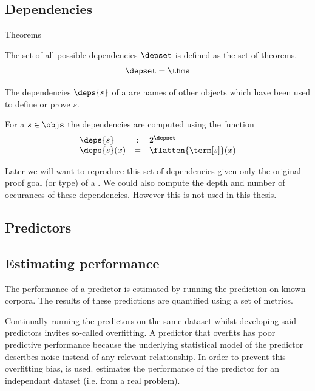 \subsection{Dependencies}
\label{sections:deps}

Theorems 
\begin{definition}\label{def:depset}
  The set of all possible dependencies $\depset$ is defined as the set of theorems.
  $$
  \depset = \thms
  $$
\end{definition}

The dependencies $\deps{s}$ of a \coqobj[s] are names of other objects which have been used to define or prove $s$.

\begin{definition}\label{def:deps}
  For a \coqobj $s \in \objs$ the dependencies are computed using the function
  $$
  \begin{array}{lcl}
    \deps{s} & : & 2^{\depset} \\
    \deps{s}(x) & = & \flatten{\term[s]}(x)
  \end{array}
  $$
\end{definition}

Later we will want to reproduce this set of dependencies given only the original proof goal (or type) of a \coqobj.
We could also compute the depth and number of occurances of these dependencies.
However this is not used in this thesis.

\subsection{Predictors}


\subsection{Estimating performance}
The performance of a predictor is estimated by running the prediction on known corpora.
The results of these predictions are quantified using a set of metrics.

Continually running the predictors on the same dataset whilst developing said predictors invites so-called overfitting.
A predictor that overfits has poor predictive performance because the underlying statistical model of the predictor describes noise instead of any relevant relationship.
In order to prevent this overfitting bias, \crossvalidation is used.
\crossvalidation estimates the performance of the predictor for an independant dataset (i.e. from a real problem).

